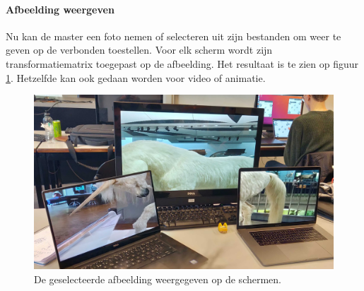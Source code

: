 \paragraph{Afbeelding  weergeven}
Nu kan de master een foto nemen of selecteren uit zijn bestanden om weer te geven op de verbonden toestellen. Voor elk scherm wordt zijn transformatiematrix toegepast op de afbeelding. Het resultaat is te zien op figuur \ref{fig:resultaat}. Hetzelfde kan ook gedaan worden voor video of animatie.
\begin{figure}[H]
	\centering
	\includegraphics[scale=0.09]{img/resultaat.jpg}
	\caption{De geselecteerde afbeelding weergegeven op de schermen.}
	\label{fig:resultaat}
\end{figure}